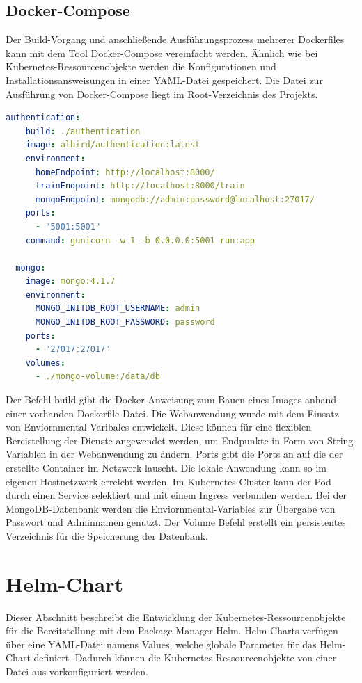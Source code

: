 \subsection{Docker-Compose}

Der Build-Vorgang und anschließende Ausführungsprozess mehrerer Dockerfiles kann mit dem Tool Docker-Compose vereinfacht werden.
Ähnlich wie bei Kubernetes-Ressourcenobjekte werden die Konfigurationen und Installationsansweisungen in einer YAML-Datei gespeichert.
Die Datei zur Ausführung von Docker-Compose liegt im Root-Verzeichnis des Projekts.

\begin{lstlisting}[caption={Ausschnit aus dem docker-compose.yaml},captionpos=b ,label={lst:docker-compose.yaml},language=yaml]
  authentication:
    build: ./authentication
    image: albird/authentication:latest
    environment:
      homeEndpoint: http://localhost:8000/
      trainEndpoint: http://localhost:8000/train 
      mongoEndpoint: mongodb://admin:password@localhost:27017/
    ports:
      - "5001:5001"
    command: gunicorn -w 1 -b 0.0.0.0:5001 run:app

  mongo:
    image: mongo:4.1.7
    environment:
      MONGO_INITDB_ROOT_USERNAME: admin
      MONGO_INITDB_ROOT_PASSWORD: password
    ports:
      - "27017:27017"
    volumes:
      - ./mongo-volume:/data/db
\end{lstlisting}

Der Befehl build gibt die Docker-Anweisung zum Bauen eines Images anhand einer vorhanden Dockerfile-Datei.
Die Webanwendung wurde mit dem Einsatz von Enviornmental-Varibales entwickelt.
Diese können für eine flexiblen Bereistellung der Dienste angewendet werden, um Endpunkte in Form von String-Variablen in der Webanwendung zu ändern.
Ports gibt die Ports an auf die der erstellte Container im Netzwerk lauscht.
Die lokale Anwendung kann so im eigenen Hostnetzwerk erreicht werden.
Im Kubernetes-Cluster kann der Pod durch einen Service selektiert und mit einem Ingress verbunden werden.
Bei der MongoDB-Datenbank werden die Enviornmental-Variables zur Übergabe von Passwort und Adminnamen genutzt.
Der Volume Befehl erstellt ein persistentes Verzeichnis für die Speicherung der Datenbank.


\section{Helm-Chart}
Dieser Abschnitt beschreibt die Entwicklung der Kubernetes-Ressourcenobjekte für die Bereitstellung mit dem Package-Manager Helm.
Helm-Charts verfügen über eine YAML-Datei namens Values, welche globale Parameter für das Helm-Chart definiert.
Dadurch können die Kubernetes-Ressourcenobjekte von einer Datei aus vorkonfiguriert werden.



